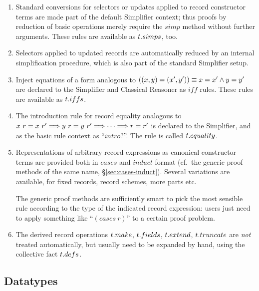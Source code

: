 \begin{enumerate}
  
\item Standard conversions for selectors or updates applied to record
  constructor terms are made part of the default Simplifier context; thus
  proofs by reduction of basic operations merely require the $simp$ method
  without further arguments.  These rules are available as $t{\mathord.}simps$,
  too.
  
\item Selectors applied to updated records are automatically reduced by an
  internal simplification procedure, which is also part of the standard
  Simplifier setup.

\item Inject equations of a form analogous to $((x, y) = (x', y')) \equiv x=x'
  \wedge y=y'$ are declared to the Simplifier and Classical Reasoner as $iff$
  rules.  These rules are available as $t{\mathord.}iffs$.

\item The introduction rule for record equality analogous to $x~r = x~r' \Longrightarrow
  y~r = y~r' \Longrightarrow \dots \Longrightarrow r = r'$ is declared to the Simplifier, and as the
  basic rule context as ``$intro?$''.  The rule is called $t{\mathord.}equality$.

\item Representations of arbitrary record expressions as canonical constructor
  terms are provided both in $cases$ and $induct$ format (cf.\ the generic
  proof methods of the same name, \S\ref{sec:cases-induct}).  Several
  variations are available, for fixed records, record schemes, more parts etc.
  
  The generic proof methods are sufficiently smart to pick the most sensible
  rule according to the type of the indicated record expression: users just
  need to apply something like ``$(cases~r)$'' to a certain proof problem.

\item The derived record operations $t{\mathord.}make$, $t{\mathord.}fields$,
  $t{\mathord.}extend$, $t{\mathord.}truncate$ are \emph{not} treated automatically, but
  usually need to be expanded by hand, using the collective fact
  $t{\mathord.}defs$.

\end{enumerate}


\subsection{Datatypes}\label{sec:hol-datatype}

